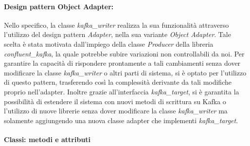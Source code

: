 \paragraph{Design pattern Object Adapter:}
Nello specifico, la classe \textit{kafka\_writer} realizza la sua funzionalità attraverso l'utilizzo del design pattern \textit{Adapter}, nella sua variante \textit{Object Adapter}. Tale scelta è stata motivata dall'impiego della classe \textit{Producer} della libreria \textit{confluent\_kafka}, la quale potrebbe subire variazioni non controllabili da noi. Per garantire la capacità di rispondere prontamente a tali cambiamenti senza dover modificare la classe \textit{kafka\_writer} o altri parti di sistema, si è optato per l'utilizzo di questo pattern, trasferendo così la complessità derivante da tali modifiche proprio nell'adapter.
Inoltre grazie all'interfaccia \textit{kafka\_target}, si è garantita la possibilità di estendere il sistema con nuovi metodi di scrittura su Kafka o l'utilizzo di nuove librerie senza dover modificare la classe \textit{kafka\_writer} ma solamente aggiungendo una nuova classe adapter che implementi \textit{kafka\_target}.

\paragraph{Classi: metodi e attributi}

